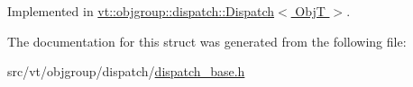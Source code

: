 Implemented in \hyperlink{structvt_1_1objgroup_1_1dispatch_1_1_dispatch_a9e6b35e9ff07fcc30c69b37fed60f770}{vt\+::objgroup\+::dispatch\+::\+Dispatch$<$ Obj\+T $>$}.



The documentation for this struct was generated from the following file\+:\begin{DoxyCompactItemize}
\item 
src/vt/objgroup/dispatch/\hyperlink{dispatch__base_8h}{dispatch\+\_\+base.\+h}\end{DoxyCompactItemize}
